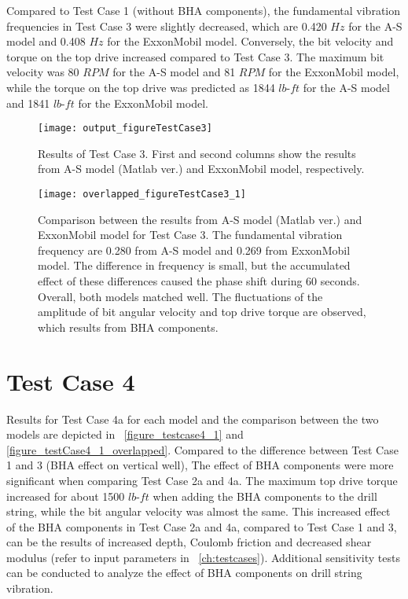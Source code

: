 Compared to Test Case 1 (without BHA components), the fundamental vibration frequencies in Test Case 3 were slightly decreased, which are 0.420 $Hz$ for the A-S model and 0.408 $Hz$ for the ExxonMobil model. Conversely, the bit velocity and torque on the top drive increased compared to Test Case 3. The maximum bit velocity was 80 $RPM$ for the A-S model and 81 $RPM$ for the ExxonMobil model, while the torque on the top drive was predicted as 1844 $lb\mbox{-}ft$ for the A-S model and 1841 $lb\mbox{-}ft$ for the ExxonMobil model. 

\begin{figure}
  \centering
  \texttt{[image: output\_figureTestCase3]}
  \caption[Results of Test Case 3]{Results of Test Case 3. First and second columns show the results from A-S model (Matlab ver.) and ExxonMobil model, respectively.}\label{figure_testcase3}
\end{figure}
\begin{figure}
  \centering
  \texttt{[image: overlapped\_figureTestCase3\_1]}
  \caption[Comparison of the results for Test Case 3]{Comparison between the results from A-S model (Matlab ver.) and ExxonMobil model for Test Case 3. The fundamental vibration frequency are 0.280 from A-S model and 0.269 from ExxonMobil model. The difference in frequency is small, but the accumulated effect of these differences caused the phase shift during 60 seconds. Overall, both models matched well. The fluctuations of the amplitude of bit angular velocity and top drive torque are observed, which results from BHA components.}\label{figure_testcase3_overlapped}
\end{figure}

\section{Test Case 4}
Results for Test Case 4a for each model and the comparison between the two models are depicted in \figurename~\ref{figure_testcase4_1} and \ref{figure_testCase4_1_overlapped}. Compared to the difference between Test Case 1 and 3 (BHA effect on vertical well), The effect of BHA components were more significant when comparing Test Case 2a and 4a. The maximum top drive torque increased for about 1500 $lb\mbox{-}ft$ when adding the BHA components to the drill string, while the bit angular velocity was almost the same. This increased effect of the BHA components in Test Case 2a and 4a, compared to Test Case 1 and 3, can be the results of increased depth, Coulomb friction and decreased shear modulus (refer to input parameters in \chaptername~\ref{ch:testcases}). Additional sensitivity tests can be conducted to analyze the effect of BHA components on drill string vibration.

